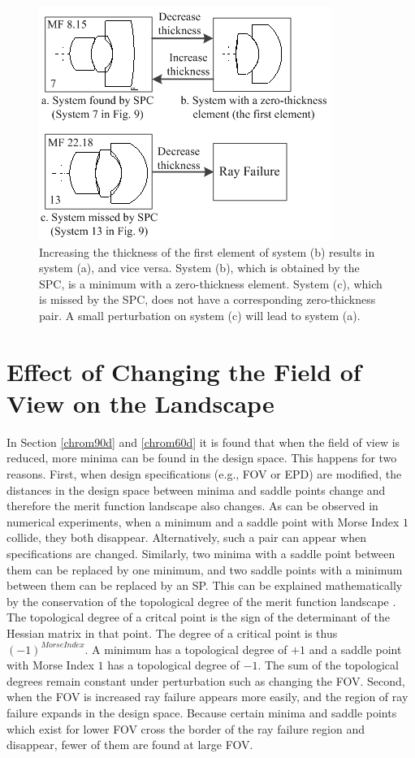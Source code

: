 \begin{figure}[h!]
    \centering
    \includegraphics[scale=0.7]{chapter-3/figures/thicknesschange.png}
    \caption{Increasing the thickness of the first element of system (b) results in system (a), and vice versa. System (b), which is obtained by the SPC, is a minimum with a zero-thickness element. System (c), which is missed by the SPC, does not have a corresponding zero-thickness pair. A small perturbation on system (c) will lead to system (a).}
    \label{fig:thicknesschange}
\end{figure}


\newpage
\section{Effect of Changing the Field of View on the Landscape}
In Section \ref{chrom90d} and \ref{chrom60d} it is found that when the field of view is reduced, more minima can be found in the design space. This happens for two reasons. First, when design specifications (e.g., FOV or EPD) are modified, the distances in the design space between minima and saddle points change
and therefore the merit function landscape also changes. As can be observed in numerical experiments, when a minimum and a saddle point with Morse Index $1$ collide, they both disappear. Alternatively, such a pair can appear when specifications are changed. Similarly, two minima with a saddle point between them can be replaced by one minimum, and two saddle points with a minimum between them can be replaced by an SP. This can be explained mathematically by the conservation of the topological degree of the merit function landscape \cite{vanTurnhoutThesis2009} \cite{KoornwinderTopologicaldegree}. The topological degree of a critcal point is the sign of the determinant of the Hessian matrix in that point. The degree of a critical point is thus $(-1)^{Morse Index}$. A minimum has a topological degree of $+1$ and a saddle point with Morse Index $1$ has a topological degree of $-1$. The sum of the topological degrees remain constant under perturbation such as changing the FOV. Second, when the FOV is increased ray failure appears more easily, and the region of ray failure expands in the design space. Because certain minima and saddle points which exist for lower FOV cross the border of the ray failure region and disappear, fewer of them are found at large FOV.

